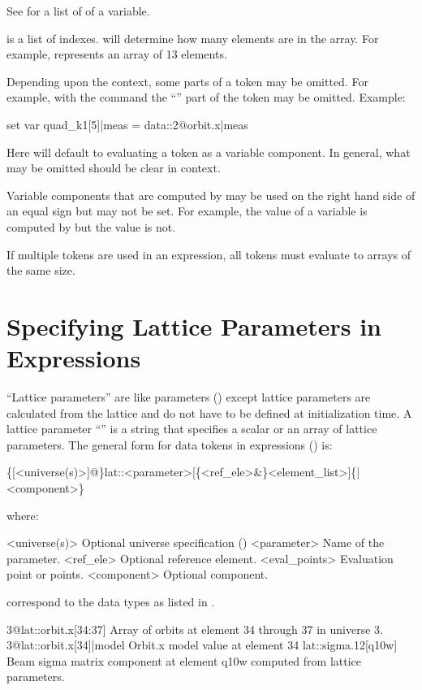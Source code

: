 See  for a list of  of a variable.

 is a list of indexes.  will determine
how many elements are in the array. For example,  
represents an array of 13 elements. 

Depending upon the context, some parts of a token may be omitted. For example,
with the  command the ``'' part of the token may be omitted.
Example:
\begin{example}
  set var quad_k1[5]|meas = data::2@orbit.x|meas
\end{example}
Here \tao will default to evaluating a token as a variable component. In general, what may
be omitted should be clear in context.

Variable components that are computed by \tao may be used on the right hand side of an equal
sign but may not be set. For example, the  value of a variable is computed by \tao
but the  value is not.

If multiple tokens are used in an expression, all tokens must evaluate to arrays of the
same size.

\section{Specifying Lattice Parameters in Expressions}
\label{s:lat.token}

``Lattice parameters'' are like  parameters () except lattice
parameters are calculated from the lattice and do not have to be defined at initialization
time.  A lattice parameter ``'' is a string that specifies a scalar or an array of lattice
parameters. The general form for data tokens in expressions () is:
\begin{example}
  \{[<universe(s)>]@\}lat::<parameter>[\{<ref_ele>&\}<element_list>]\{|<component>\}
\end{example}
where:
\begin{example}
  <universe(s)>       Optional universe specification ()
  <parameter>         Name of the parameter.
  <ref_ele>           Optional reference element.
  <eval_points>       Evaluation point or points.
  <component>         Optional component. 
\end{example}
correspond to the data types as listed in . 
\begin{example}
  3@lat::orbit.x[34:37]          Array of orbits at element 34 through 37 in universe 3.
  3@lat::orbit.x[34]|model       Orbit.x model value at element 34
  lat::sigma.12[q10w]            Beam sigma matrix component at element q10w computed 
                                  from lattice parameters.
\end{example}


